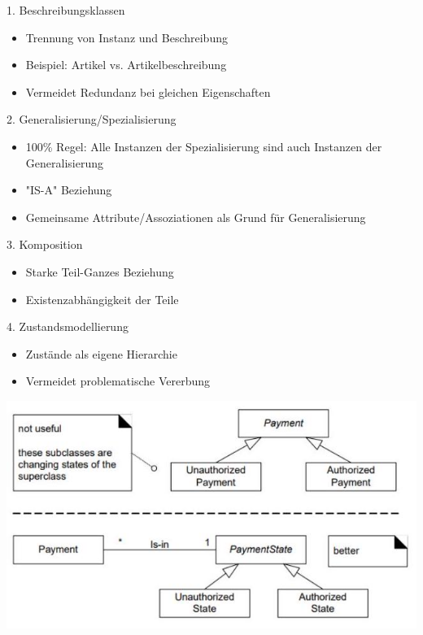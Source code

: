 \begin{concept}{1. Beschreibungsklassen}
\begin{itemize}
    \item Trennung von Instanz und Beschreibung
    \item Beispiel: Artikel vs. Artikelbeschreibung
    \item Vermeidet Redundanz bei gleichen Eigenschaften
\end{itemize}
\end{concept}

\begin{concept}{2. Generalisierung/Spezialisierung}
\begin{itemize}
    \item 100\% Regel: Alle Instanzen der Spezialisierung sind auch Instanzen der Generalisierung
    \item "IS-A" Beziehung
    \item Gemeinsame Attribute/Assoziationen als Grund für Generalisierung
\end{itemize}
\end{concept}

\begin{concept}{3. Komposition}
\begin{itemize}
    \item Starke Teil-Ganzes Beziehung
    \item Existenzabhängigkeit der Teile
\end{itemize}
\end{concept}

\begin{concept}{4. Zustandsmodellierung}
\begin{itemize}
    \item Zustände als eigene Hierarchie
    \item Vermeidet problematische Vererbung
\end{itemize}
\includegraphics[width=0.9\linewidth]{images/2024_12_29_0d1d7b5551ea1b4b41bdg-07(1)}
\end{concept}

